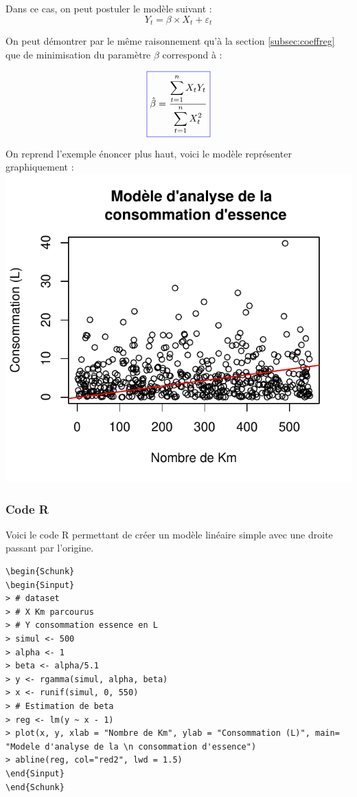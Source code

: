 \documentclass[11pt,french]{report}
\begin{document}
Dans ce cas, on peut postuler le modèle suivant :
\begin{equation}
\label{eq:regzero}
Y_t = \beta \times X_t + \varepsilon_t
\end{equation}

On peut démontrer par le même raisonnement qu'à la section \ref{subsec:coeffreg} que de minimisation du paramètre $\beta$ correspond à :

\begin{equation}
\label{eq:betasimp}
\color{blue}
\boxed{\color{black}
\hat{\beta} = \frac{\displaystyle\sum_{t=1}^n X_t Y_t}{\displaystyle\sum_{t=1}^n X_t^2}}
\end{equation}

On reprend l'exemple énoncer plus haut, voici le modèle représenter graphiquement :
\includegraphics{notes_de_cours-010}

\subsubsection*{Code R}
Voici le code R permettant de créer un modèle linéaire simple avec une droite passant par l'origine.

\begin{lstlisting}[linerange=\\begin\{Sinput\}-\\end\{Sinput\},includerangemarker=false, caption = Code source en R pour l'exemple]
\begin{Schunk}
\begin{Sinput}
> # dataset
> # X Km parcourus
> # Y consommation essence en L
> simul <- 500
> alpha <- 1
> beta <- alpha/5.1
> y <- rgamma(simul, alpha, beta)
> x <- runif(simul, 0, 550)
> # Estimation de beta
> reg <- lm(y ~ x - 1)
> plot(x, y, xlab = "Nombre de Km", ylab = "Consommation (L)", main= "Modele d'analyse de la \n consommation d'essence")
> abline(reg, col="red2", lwd = 1.5)
\end{Sinput}
\end{Schunk}
\end{lstlisting}
\bigskip
\end{document}
